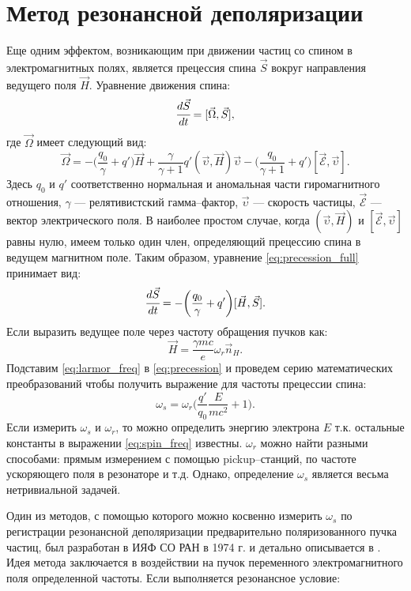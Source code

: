 \section{Метод резонансной деполяризации}
Еще одним эффектом, возникающим при движении частиц со спином в электромагнитных полях, является прецессия спина $\vec{S}$ вокруг направления ведущего поля $\vec{H}$. Уравнение движения спина:
\begin{equation}
\cfrac{d\vec{S}}{dt} = [\vec{\Omega},\vec{S}],
\label{eq:precession_full}
\end{equation}
где $\vec{\Omega}$ имеет следующий вид:
\begin{equation}
\vec{\Omega} = -\biggl(\frac{q_0}{\gamma}+q'\biggr) \vec{H} + \frac{\gamma}{\gamma + 1}q' (\vec{\upsilon},\vec{H})\vec{\upsilon}- \biggl(\frac{q_0}{\gamma+1}  + q'\biggr)[\vec{\mathcal{E}},\vec{\upsilon}].
\end{equation}%
Здесь $q_0$ и $q'$ соответственно нормальная и аномальная части гиромагнитного отношения, $\gamma$ --- релятивистский гамма--фактор, $\vec{\upsilon}$ --- скорость частицы, $\vec{\mathcal{E}}$ --- вектор электрического поля.
В наиболее простом случае, когда $(\vec{\upsilon}, \vec{H})$ и $[\vec{\mathcal{E}},\vec{\upsilon}]$ равны нулю, имеем только один член, определяющий прецессию спина в ведущем магнитном поле. Таким образом, уравнение \ref{eq:precession_full} принимает вид:
\begin{equation}
\cfrac{d\vec{S}}{dt} = -\biggl(\frac{q_0}{\gamma}+q'\biggr) [\vec{H}, \vec{S}].
\label{eq:precession}
\end{equation}%
Если выразить ведущее поле через частоту обращения пучков как: 
\begin{equation}
\vec{H} = \frac {\gamma mc}{e}\omega_r\vec{n}_H.
\label{eq:larmor_freq}
\end{equation}
Подставим \ref{eq:larmor_freq} в \ref{eq:precession} и проведем серию математических преобразований чтобы получить выражение для частоты прецессии спина:
\begin{equation}
\omega_s=  \omega_{r}\bigg(\frac{q'}{q_0}\frac{E}{mc^2}+1\bigg).
\label{eq:spin_freq}
\end{equation}
Если измерить $\omega_s$ и $\omega_{r}$, то можно определить энергию электрона $E$ т.к. остальные константы в выражении \ref{eq:spin_freq} известны. $\omega_{r}$ можно найти разными способами: прямым измерением с помощью pickup--станций, по частоте ускоряющего поля в резонаторе и т.д. Однако, определение $\omega_s$ является весьма нетривиальной задачей. 
\par Один из методов, с помощью которого можно косвенно измерить  $\omega_s$ по регистрации резонансной деполяризации предварительно поляризованного пучка частиц, был разработан в ИЯФ СО РАН в 1974 г. и детально описывается в \cite{skrinskii}. Идея метода заключается в воздействии на пучок переменного электромагнитного поля определенной частоты. Если выполняется резонансное условие:

